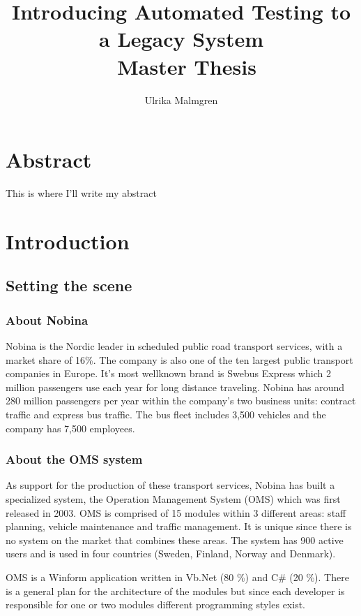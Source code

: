 \documentclass{article}
\title{Introducing Automated Testing to a Legacy System \\\ Master Thesis}
\author{Ulrika Malmgren}
\begin{document}
	\maketitle
	\newpage


	\section*{Abstract}
	This is where I'll write my abstract
	\newpage 

	\tableofcontents
	\newpage


	\section{Introduction}
	\subsection{Setting the scene}
		\subsubsection{About Nobina}
		Nobina is the Nordic leader in scheduled public road transport services, with a market share of 16\%.
		The company is also one of the ten largest public transport companies in Europe. It's most wellknown brand is Swebus Express which 2 million passengers use each year for long distance
		traveling. Nobina has around 280 million passengers per year within the company’s two business units: contract traffic and express bus traffic. The bus fleet includes 3,500 vehicles and the company has 7,500 employees.

		\subsubsection{About the OMS system}
		As support for the production of these transport services, Nobina has built a specialized system, the Operation Management System (OMS) which was first released in 2003. OMS is comprised of 15 modules within 3 different areas: staff planning, vehicle maintenance and traffic management. It is unique since there is no system on the market that combines these areas. The system has 900 active users and is used in four countries (Sweden, Finland, Norway and Denmark).

		OMS is a Winform application written in Vb.Net (80 \%) and C\# (20 \%). There is a general plan for the architecture of the modules but since each developer is responsible for one or two modules different programming styles exist.
\end{document}
